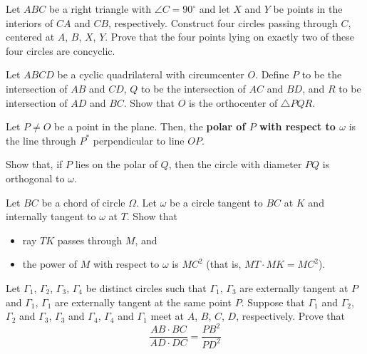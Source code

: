 \documentclass{scrartcl}
\providecommand{\dg}{^\circ}
\providecommand{\ii}{\item}
\providecommand{\alert}{\textbf}
\begin{document}
\begin{problem}
	Let $ABC$ be a right triangle with $\angle C = 90\dg$
	and let $X$ and $Y$ be points in the interiors of $CA$ and $CB$,
	respectively. Construct four circles passing through $C$, centered
	at $A$, $B$, $X$, $Y$.
	Prove that the four points lying on exactly two of these four circles
	are concyclic.
\end{problem}

\begin{problem}
	Let $ABCD$ be a cyclic quadrilateral with circumcenter $O$.
	Define $P$ to be the intersection of $AB$ and $CD$,
	$Q$ to be the intersection of $AC$ and $BD$,
	and $R$ to be intersection of $AD$ and $BC$.
	Show that $O$ is the orthocenter of $\triangle PQR$.
\end{problem}

\begin{definition*}
	Let $P\ne O$ be a point in the plane. Then, the \alert{polar of $P$
	with respect to $\omega$} is the line through $P^\ast$
	perpendicular to line $OP$.
\end{definition*}

\begin{problem}
	Show that, if $P$ lies on the polar of $Q$, then
	the circle with diameter $PQ$ is orthogonal to $\omega$.
\end{problem}

\begin{problem}
	Let $BC$ be a chord of circle $\Omega$.
	Let $\omega$ be a circle tangent to $BC$ at $K$
	and internally tangent to $\omega$ at $T$.
	Show that
	\begin{itemize}
		\ii ray $TK$ passes through $M$, and
		\ii the power of $M$ with respect to $\omega$ is $MC^2$
		(that is, $MT\cdot MK = MC^2$).
	\end{itemize}
\end{problem}

\begin{problem}[Shortlist 2003 G4]
	Let $\Gamma_1$, $\Gamma_2$, $\Gamma_3$, $\Gamma_4$ be
	distinct circles such that $\Gamma_1$, $\Gamma_3$
	are externally tangent at $P$ and $\Gamma_1$, $\Gamma_1$
	are externally tangent at the same point $P$.
	Suppose that $\Gamma_1$ and $\Gamma_2$, $\Gamma_2$ and $\Gamma_3$,
	$\Gamma_3$ and $\Gamma_4$, $\Gamma_4$ and $\Gamma_1$ meet at
	$A$, $B$, $C$, $D$, respectively.
	Prove that
	\[\frac{AB\cdot BC}{AD\cdot DC} = \frac{PB^2}{PD^2}\]
\end{problem}
\end{document}
